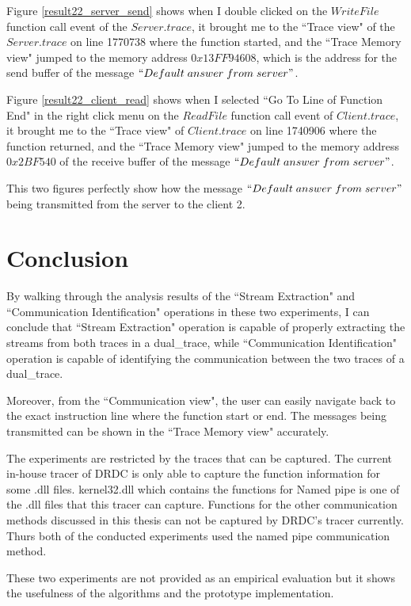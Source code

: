 Figure \ref{result22_server_send} shows when I double clicked on the $WriteFile$ function call event of the $Server.trace$, it brought me to the ``Trace view" of the $Server.trace$ on line 1770738 where the function started, and the ``Trace Memory view" jumped to the memory address $0x13FF94608$, which is the address for the send buffer of the message $``Default\; answer\; from\; server"$.

Figure \ref{result22_client_read} shows when I selected ``Go To Line of Function End" in the right click menu on the $ReadFile$ function call event of $Client.trace$, it brought me to the ``Trace view" of $Client.trace$ on line 1740906 where the function returned, and the ``Trace Memory view" jumped to the memory address $0x2BF540$ of the receive buffer of the message $``Default\; answer\; from\; server"$.

This two figures perfectly show how the message $``Default\; answer\; from\; server"$ being transmitted from the server to the client 2.

\section{Conclusion}
By walking through the analysis results of the ``Stream Extraction" and ``Communication Identification" operations in these two experiments, I can conclude that ``Stream Extraction" operation is capable of properly extracting the streams from both traces in a dual\_trace, while ``Communication Identification" operation is capable of identifying the communication between the two traces of a dual\_trace. 

Moreover, from the ``Communication view", the user can easily navigate back to the exact instruction line where the function start or end. The messages being transmitted can be shown in the ``Trace Memory view" accurately.

The experiments are restricted by the traces that can be captured.  The current in-house tracer of DRDC is only able to capture the function information for some .dll files. kernel32.dll which contains the functions for Named pipe is one of the .dll files that this tracer can capture. Functions for the other communication methods discussed in this thesis can not be captured by DRDC's tracer currently.  Thurs both of the conducted experiments used the named pipe communication method. 

These two experiments are not provided as an empirical evaluation but it shows the usefulness of the algorithms and the prototype implementation.







   




